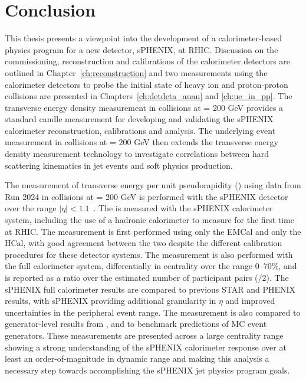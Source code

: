 \chapter{Conclusion}
\label{ch:discussion}
This thesis presents a viewpoint into the development of a calorimeter-based physics program for a new detector, sPHENIX, at RHIC. Discussion on the commissioning, reconstruction and calibrations of the calorimeter detectors are outlined in Chapter~\ref{ch:reconstruction} and two measurements using the calorimeter detectors to probe the initial state of heavy ion and proton-proton collisions are presented in Chapters~\ref{ch:detdeta_auau} and \ref{ch:ue_in_pp}. The transverse energy density measurement in \auau collisions at \snn = 200 GeV provides a standard candle measurement for developing and validating the sPHENIX calorimeter reconstruction, calibrations and analysis. The underlying event measurement in \pp collisions at \sqs = 200 GeV then extends the transverse energy density measurement technology to investigate correlations between hard scattering kinematics in jet events and soft physics production. 

The measurement of transverse energy per unit pseudorapidity (\detdeta) using data from Run 2024 in \auau collisions at \snn = 200 GeV is performed with the sPHENIX detector over the range $\left|\eta\right| < 1.1$~\cite{sphenix_detdeta,ppg03AN}. 
The \detdeta is measured with the sPHENIX calorimeter system, including the use of a hadronic calorimeter to measure \detdeta for the first time at RHIC. 
The measurement is first performed using only the EMCal and only the HCal, with good agreement between the two despite the different calibration procedures for these detector systems. 
The measurement is also performed with the full calorimeter system, differentially in centrality over the range $0$--$70$\%, and is reported as a ratio over the estimated number of participant pairs (\Npart/2). 
The sPHENIX full calorimeter results are compared to previous STAR and PHENIX results, with sPHENIX providing additional granularity in $\eta$ and improved uncertainties in the peripheral event range. 
The measurement is also compared to generator-level results from \hijing, \epos and \ampt to benchmark predictions of MC event generators. 
These measurements are presented across a large centrality range showing a strong understanding of the sPHENIX calorimeter response over at least an order-of-magnitude in dynamic range and making this analysis a necessary step towards accomplishing the sPHENIX jet physics program goals. 

